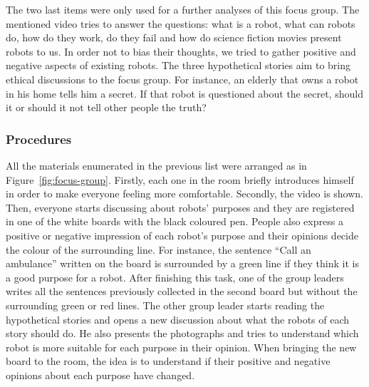 The two last items were only used for a further analyses of this focus group.
The mentioned video tries to answer the questions: what is a robot, what can robots do, how do they work, do they fail and how do science fiction movies present robots to us.
In order not to bias their thoughts, we tried to gather positive and negative aspects of existing robots.
The three hypothetical stories aim to bring ethical discussions to the focus group.
For instance, an elderly that owns a robot in his home tells him a secret.
If that robot is questioned about the secret, should it or should it not tell other people the truth?

\subsubsection{Procedures}
All the materials enumerated in the previous list were arranged as in Figure~\ref{fig:focus-group}.
Firstly, each one in the room briefly introduces himself in order to make everyone feeling more comfortable.
Secondly, the video is shown.
Then, everyone starts discussing about robots' purposes and they are registered in one of the white boards with the black coloured pen.
People also express a positive or negative impression of each robot's purpose and their opinions decide the colour of the surrounding line.
For instance, the sentence ``Call an ambulance'' written on the board is surrounded by a green line if they think it is a good purpose for a robot.
After finishing this task, one of the group leaders writes all the sentences previously collected in the second board but without the surrounding green or red lines.
The other group leader starts reading the hypothetical stories and opens a new discussion about what the robots of each story should do.
He also presents the photographs and tries to understand which robot is more suitable for each purpose in their opinion.
When bringing the new board to the room, the idea is to understand if their positive and negative opinions about each purpose have changed.

